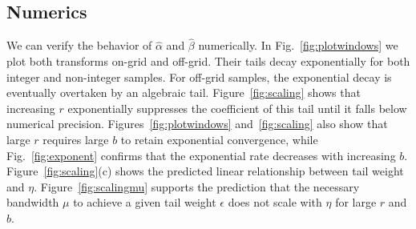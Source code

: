 \documentclass[aps,floatfix,10pt,amssymb,amsfont,amsmath,superscriptaddress,float,nofootinbib,longbibliography,nobalancelastpage,twocolumn]{revtex4-2}
\begin{document}
\subsection{Numerics}
We can verify the behavior of $\hat \alpha$ and $\hat \beta$ numerically. In Fig.~\ref{fig:plotwindows} we plot both transforms on-grid and off-grid. Their tails decay exponentially for both integer and non-integer samples. For off-grid samples, the exponential decay is eventually overtaken by an algebraic tail. Figure~\ref{fig:scaling} shows that increasing $r$ exponentially suppresses the coefficient of this tail until it falls below numerical precision. Figures~\ref{fig:plotwindows} and~\ref{fig:scaling} also show that large $r$ requires large $b$ to retain exponential convergence, while Fig.~\ref{fig:exponent} confirms that the exponential rate decreases with increasing $b$. Figure~\ref{fig:scaling}(c) shows the predicted linear relationship between tail weight and $\eta$. Figure~\ref{fig:scalingmu} supports the prediction that the necessary bandwidth $\mu$ to achieve a given tail weight $\epsilon$ does not scale with $\eta$ for large $r$ and $b$. 
\end{document}
